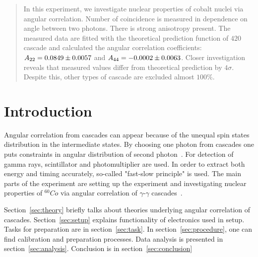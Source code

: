 \begin{abstract}
   In this experiment, we investigate nuclear properties of cobalt nuclei via angular correlation. Number of coincidence is measured in dependence on angle between two photons. There is strong anisotropy present. The measured data are fitted with the theoretical prediction function of $420$ cascade and calculated the angular correlation coefficients: $ A_{22}= \num{0.0849 +- 0.0057} $ and $A_{44}=\num{-0.0002 +- 0.0063}  $. Closer investigation reveals that measured values differ from theoretical prediction by $4\sigma$. Despite this, other types of cascade are excluded almost $100\%$.
\end{abstract}

\section{Introduction}
Angular correlation from cascades can appear because of the unequal spin states distribution in the intermediate states. By choosing one photon from cascades one puts constraints in angular distribution of second photon~\cite{descr}. For detection of gamma rays, scintillator and photomultiplier are used. In order to extract both energy and timing accurately, so-called "fast-slow principle" is used. The main parts of the experiment are setting up the experiment and investigating nuclear properties of $ ^{60}Co $ via angular correlation of $ \gamma$-$\gamma $ cascades~\cite{descr}.

Section~\ref{sec:theory} briefly talks about theories underlying angular correlation of cascades. Section~\ref{sec:setup} explains functionality of electronics used in setup. Tasks for preparation are in section~\ref{sec:task}. In section~\ref{sec:procedure}, one can find calibration and preparation processes. Data analysis is presented in section~\ref{sec:analysis}. Conclusion is in section~\ref{sec:conclusion}
